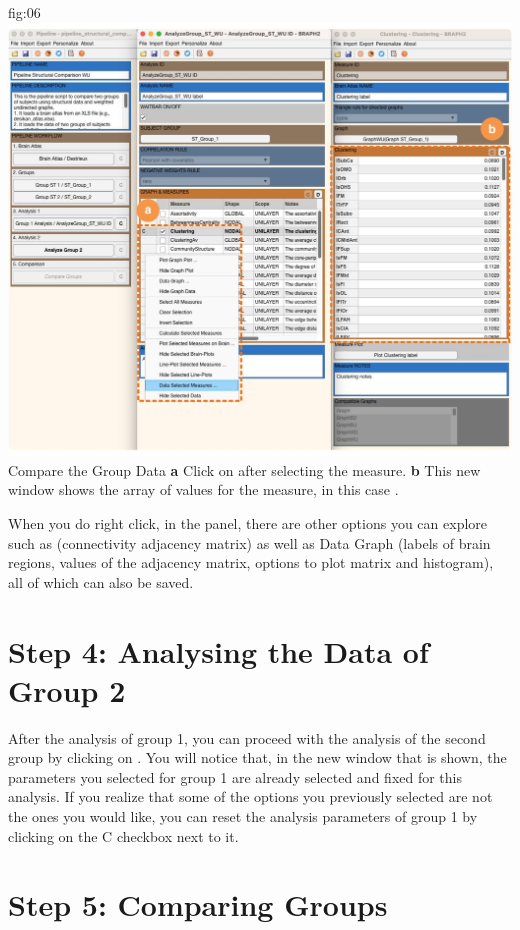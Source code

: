 \documentclass[justified]{tufte-handout}
\begin{document}
	{fig:06}
	{
	\includegraphics{fig06.jpg}
	}
	{Compare the Group Data}
	{
	{\bf a} Click on  after selecting the measure.
	{\bf b} This new window shows the array of values for the measure, in this case .
	}

  When you do right click, in the  panel, there are other options you can explore such as  (connectivity adjacency matrix) as well as Data Graph (labels of brain regions, values of the adjacency matrix, options to plot matrix and histogram), all of which can also be saved.
  
\section{Step 4: Analysing the Data of Group 2}

After the analysis of group 1, you can proceed with the analysis of the second group by clicking on . You will notice that, in the new window that is shown, the parameters you selected for group 1 are already selected and fixed for this analysis. If you realize that some of the options you previously selected are not the ones you would like, you can reset the analysis parameters of group 1 by clicking on the C checkbox next to it.

\section{Step 5: Comparing Groups}
\end{document}
